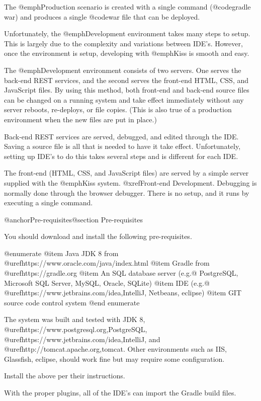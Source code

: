 The @emph{Production} scenario is created with a single command 
(@code{gradle war}) and produces a single @code{war} file that
can be deployed.

Unfortunately, the @emph{Development} environment takes many steps to
setup.  This is largely due to the complexity and variations between
IDE's.  However, once the environment is setup, developing with
@emph{Kiss} is smooth and easy.

The @emph{Development} environment consists of two servers.  One serves
the back-end REST services, and the second serves the front-end HTML, CSS, 
and JavaScript files.  By using this method, both front-end and back-end
source files can be changed on a running system and take effect immediately
without any server reboots, re-deploys, or file copies.  (This is also
true of a production environment when the new files are put in place.)

Back-end REST services are served, debugged, and edited through the IDE.
Saving a source file is all that is needed to have it take effect.
Unfortunately, setting up IDE's to do this takes several steps and is different
for each IDE.

The front-end (HTML, CSS, and JavaScript files) are served by a simple
server supplied with the @emph{Kiss} system.  @xref{Front-end Development}.
Debugging is normally done through the browser debugger.
There is no setup, and it runs by executing a single command.

@anchor{Pre-requisites}@section Pre-requisites

You should download and install the following pre-requisites.

@enumerate
@item
Java JDK 8 from @uref{https://www.oracle.com/java/index.html}
@item
Gradle from @uref{https://gradle.org}
@item
An SQL database server (e.g.@ PostgreSQL, Microsoft SQL Server, MySQL, Oracle, SQLite)
@item
IDE (e.g.@ @uref{https://www.jetbrains.com/idea,IntelliJ}, Netbeans, eclipse)
@item
GIT source code control system
@end enumerate

The system was built and tested with JDK 8, @uref{https://www.postgresql.org,PostgreSQL}, @uref{https://www.jetbrains.com/idea,IntelliJ}, and 
@uref{http://tomcat.apache.org,tomcat}.  Other environments such as IIS, Glassfish, eclipse, should work fine but may require some configuration.

Install the above per their instructions.

With the proper plugins, all of the IDE's can import the Gradle build files.

